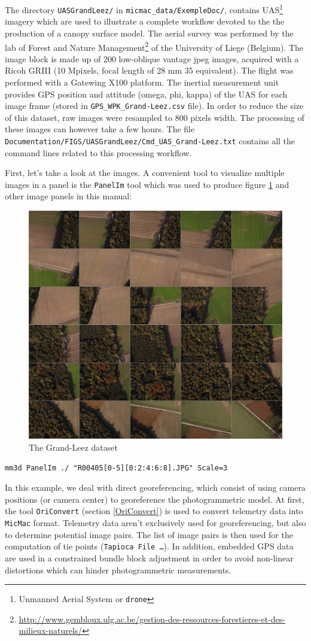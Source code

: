 The directory {\tt UASGrandLeez/} in {\tt micmac\_data/ExempleDoc/}, contains UAS\footnote{Unmanned Aerial System or {\tt drone}} imagery which are used to illustrate a complete workflow devoted to the the production of a canopy surface model. 
The aerial survey was performed by the lab of Forest and Nature Management\footnote{\url{http://www.gembloux.ulg.ac.be/gestion-des-ressources-forestieres-et-des-milieux-naturels/}} of the University of Liege (Belgium). 
The image block is made up of 200 low-oblique vantage jpeg images, acquired with a Ricoh GRIII (10 Mpixels, focal length of 28 mm 35 equivalent). 
The flight was performed with a Gatewing X100 platform.
The inertial measurement unit provides GPS position and attitude (omega, phi, kappa) of the UAS for each image frame (stored in {\tt GPS\_WPK\_Grand-Leez.csv} file). 
In order to reduce the size of this dataset, raw images were resampled to 800 pixels width. 
The processing of these images can however take a few hours. 
The file {\tt  Documentation/FIGS/UASGrandLeez/Cmd\_UAS\_Grand-Leez.txt} contains all the command lines related to this processing workflow.

First, let's take a look at the images. 
A convenient tool to visualize multiple images in a panel is the {\tt PanelIm} tool which was used to produce figure \ref{FIG:panel-GL} and other image panels in this manual:

\begin{figure}[H]
\centering
\includegraphics[height=0.5\linewidth]{FIGS/UASGrandLeez/PanelGL.JPG}
\caption{The Grand-Leez dataset}
\label{FIG:panel-GL}
\end{figure}

\begin{verbatim}
mm3d PanelIm ./ "R00405[0-5][0:2:4:6:8].JPG" Scale=3
\end{verbatim}

In this example, we deal with direct georeferencing, which consist of using camera positions (or camera center) to georeference the photogrammetric model. 
At first, the tool {\tt OriConvert} (section \ref{OriConvert})  is used to convert telemetry data into {\tt MicMac} format. 
Telemetry data aren't exclusively used for georeferencing, but also to determine potential image pairs.
The list of image pairs is then used for the computation of tie points ({\tt Tapioca File \dots}). 
In addition, embedded GPS data are used in a constrained bundle block adjustment in order to avoid non-linear distortions which can hinder photogrammetric measurements.

